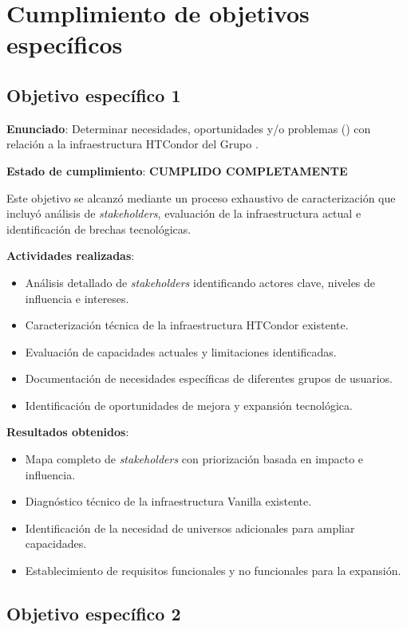 \section{Cumplimiento de objetivos específicos}
\noindent

\subsection{Objetivo específico 1}
\noindent

\textbf{Enunciado}: Determinar necesidades, oportunidades y/o problemas (\NPO) con relación a la infraestructura HTCondor del Grupo \GRID.

\textbf{Estado de cumplimiento}: \textbf{CUMPLIDO COMPLETAMENTE}

Este objetivo se alcanzó mediante un proceso exhaustivo de caracterización que incluyó análisis de \textit{stakeholders}, evaluación de la infraestructura actual e identificación de brechas tecnológicas.

\textbf{Actividades realizadas}:
\begin{itemize}
    \item Análisis detallado de \textit{stakeholders} identificando actores clave, niveles de influencia e intereses.
    \item Caracterización técnica de la infraestructura HTCondor existente.
    \item Evaluación de capacidades actuales y limitaciones identificadas.
    \item Documentación de necesidades específicas de diferentes grupos de usuarios.
    \item Identificación de oportunidades de mejora y expansión tecnológica.
\end{itemize}

\textbf{Resultados obtenidos}:
\begin{itemize}
    \item Mapa completo de \textit{stakeholders} con priorización basada en impacto e influencia.
    \item Diagnóstico técnico de la infraestructura Vanilla existente.
    \item Identificación de la necesidad de universos adicionales para ampliar capacidades.
    \item Establecimiento de requisitos funcionales y no funcionales para la expansión.
\end{itemize}

\subsection{Objetivo específico 2}
\noindent

